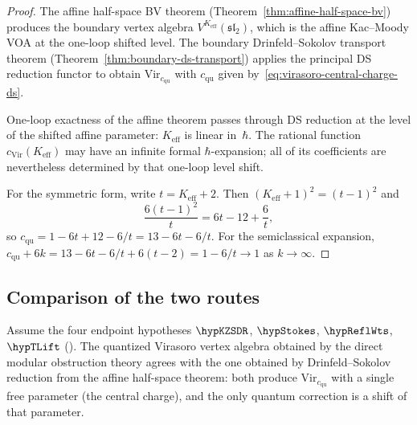 \begin{proof}
The affine half-space BV theorem
(Theorem~\ref{thm:affine-half-space-bv}) produces the boundary
vertex algebra $V^{K_{\mathrm{eff}}}(\mathfrak{sl}_2)$, which is the
affine Kac--Moody VOA at the one-loop shifted level. The boundary
Drinfeld--Sokolov transport theorem
(Theorem~\ref{thm:boundary-ds-transport}) applies the principal DS
reduction functor to obtain $\mathrm{Vir}_{c_{\mathrm{qu}}}$ with
$c_{\mathrm{qu}}$ given by~\eqref{eq:virasoro-central-charge-ds}.

One-loop exactness of the affine theorem passes through DS reduction
at the level of the shifted affine parameter: $K_{\mathrm{eff}}$ is
linear in~$\hbar$. The rational function
$c_{\mathrm{Vir}}(K_{\mathrm{eff}})$ may have an infinite formal
$\hbar$-expansion; all of its coefficients are nevertheless determined
by that one-loop level shift.

For the symmetric form, write $t = K_{\mathrm{eff}} + 2$. Then
$(K_{\mathrm{eff}}+1)^2 = (t-1)^2$ and
\[
\frac{6(t-1)^2}{t} = 6t - 12 + \frac{6}{t},
\]
so $c_{\mathrm{qu}} = 1 - 6t + 12 - 6/t = 13 - 6t - 6/t$. For the
semiclassical expansion, $c_{\mathrm{qu}} + 6k
= 13 - 6t - 6/t + 6(t-2) = 1 - 6/t \to 1$ as $k\to\infty$.
\end{proof}

\subsection{Comparison of the two routes}
\label{subsec:virasoro-comparison}

\begin{theorem}
\label{thm:virasoro-consistency}
Assume the four endpoint hypotheses $\hypKZSDR$, $\hypStokes$,
$\hypReflWts$, $\hypTLift$
\textup{(}\cite{KZ25,Costello2011Renorm,CG17,LurieHA}\textup{)}.
The quantized Virasoro vertex algebra obtained by the direct modular
obstruction theory agrees with the one obtained by Drinfeld--Sokolov
reduction from the affine half-space theorem: both produce
$\mathrm{Vir}_{c_{\mathrm{qu}}}$ with a single free parameter
(the central charge), and the only quantum correction is a shift of that
parameter.
\end{theorem}

